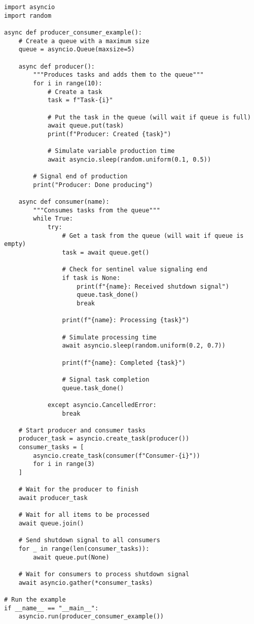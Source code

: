 \documentclass[12pt,letterpaper]{article}
\newenvironment{macterminal}{%
    \begin{mdframed}[
        linecolor=terminalFrame,
        backgroundcolor=terminalBg,
        roundcorner=5pt,
        skipabove=10pt,
        skipbelow=10pt,
        linewidth=1pt,
        innertopmargin=10pt, %
        frametitle={%
            \tikz[baseline=(current bounding box.east), outer sep=0pt]{
                \fill[red!80!black] (0,0) circle (5pt);
                \fill[yellow!80!black] (0.7,0) circle (5pt);
                \fill[green!70!black] (1.4,0) circle (5pt);
            }
        },
        frametitlealignment=\raggedright, %
        frametitleaboveskip=8pt, %
        frametitlebelowskip=0pt, %
    ]
}{%
    \end{mdframed}%
}
\begin{document}
\begin{macterminal}
\begin{lstlisting}
import asyncio
import random

async def producer_consumer_example():
    # Create a queue with a maximum size
    queue = asyncio.Queue(maxsize=5)
    
    async def producer():
        """Produces tasks and adds them to the queue"""
        for i in range(10):
            # Create a task
            task = f"Task-{i}"
            
            # Put the task in the queue (will wait if queue is full)
            await queue.put(task)
            print(f"Producer: Created {task}")
            
            # Simulate variable production time
            await asyncio.sleep(random.uniform(0.1, 0.5))
        
        # Signal end of production
        print("Producer: Done producing")
    
    async def consumer(name):
        """Consumes tasks from the queue"""
        while True:
            try:
                # Get a task from the queue (will wait if queue is empty)
                task = await queue.get()
                
                # Check for sentinel value signaling end
                if task is None:
                    print(f"{name}: Received shutdown signal")
                    queue.task_done()
                    break
                
                print(f"{name}: Processing {task}")
                
                # Simulate processing time
                await asyncio.sleep(random.uniform(0.2, 0.7))
                
                print(f"{name}: Completed {task}")
                
                # Signal task completion
                queue.task_done()
                
            except asyncio.CancelledError:
                break
    
    # Start producer and consumer tasks
    producer_task = asyncio.create_task(producer())
    consumer_tasks = [
        asyncio.create_task(consumer(f"Consumer-{i}"))
        for i in range(3)
    ]
    
    # Wait for the producer to finish
    await producer_task
    
    # Wait for all items to be processed
    await queue.join()
    
    # Send shutdown signal to all consumers
    for _ in range(len(consumer_tasks)):
        await queue.put(None)
    
    # Wait for consumers to process shutdown signal
    await asyncio.gather(*consumer_tasks)

# Run the example
if __name__ == "__main__":
    asyncio.run(producer_consumer_example())
\end{lstlisting}
\end{macterminal}
\end{document}
